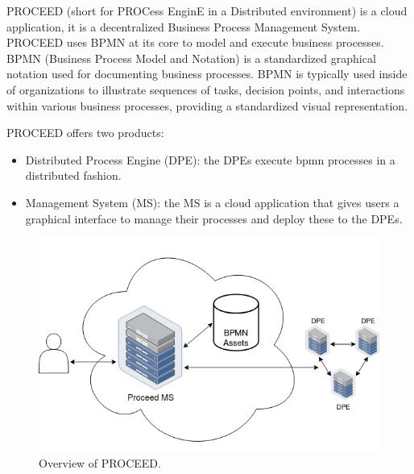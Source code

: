 PROCEED (short for PROCess EnginE in a Distributed environment) is a cloud application,
it is a decentralized Business Process Management System.
PROCEED uses BPMN at its core to model and execute business processes.
BPMN (Business Process Model and Notation) is a standardized graphical notation used for documenting business processes.
BPMN is typically used inside of organizations to illustrate sequences of tasks,
decision points, and interactions within various business processes, providing a standardized visual representation.

PROCEED offers two products:
\begin{itemize}
    \item Distributed Process Engine (DPE): the DPEs execute bpmn processes in a distributed fashion.
    \item Management System (MS): the MS is a cloud application that gives users a graphical interface to manage their processes and deploy these to the DPEs.
\end{itemize}

\begin{figure}[H]
    \centering
    \includegraphics[scale=0.45]{images/quick-ms-overview.drawio.png}
    \caption{Overview of PROCEED.}
    \label{fig:proceed-overview}
\end{figure}



